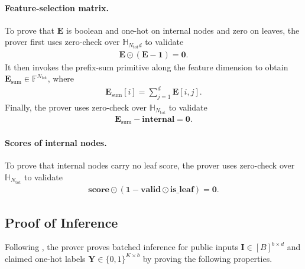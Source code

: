 \paragraph{Feature-selection matrix.}
To prove that $\mathbf{E}$ is boolean and one-hot on internal nodes and zero on leaves,
    the prover first uses zero-check over $\mathbb{H}_{N_{\mathrm{tot}}d}$ to validate
    \begin{align}
        \mathbf{E}\odot(\mathbf{E}-\mathbf{1}) = \mathbf{0}.
    \end{align}
    It then invokes the prefix-sum primitive along the feature dimension to obtain
    $\mathbf{E}_{\mathrm{sum}}\in\mathbb{F}^{N_{\mathrm{tot}}}$, where
    \begin{align}
        \mathbf{E}_{\mathrm{sum}}[i]=\sum_{j=1}^{d}\mathbf{E}[i,j].
    \end{align}
    Finally, the prover uses zero-check over $\mathbb{H}_{N_{\mathrm{tot}}}$ to validate
    \begin{align}
        \mathbf{E}_{\mathrm{sum}}-\mathbf{internal}=\mathbf{0}.
    \end{align}

\paragraph{Scores of internal nodes.}
To prove that internal nodes carry no leaf score, the prover uses zero-check over
    $\mathbb{H}_{N_{\mathrm{tot}}}$ to validate
    \begin{align}
        \mathbf{score}\odot(\mathbf{1}-\mathbf{valid}\odot\mathbf{is\_leaf})=\mathbf{0}.
    \end{align}

\subsection{Proof of Inference}

Following , the prover proves batched inference for
public inputs $\mathbf{I}\in [B]^{b\times d}$ and claimed one-hot labels
$\mathbf{Y}\in\{0, 1\}^{K\times b}$ by proving the following properties.

